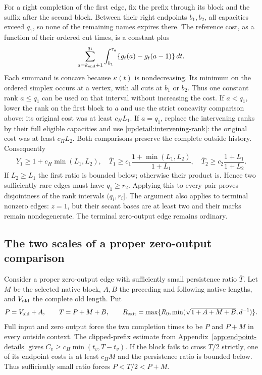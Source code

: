 For a right completion of the first edge, fix the prefix through its
block and the suffix after the second block. Between their right
endpoints $b_1,b_2$, all capacities exceed $q_1$, so none of the
remaining names expires there. The reference cost, as a function of
their ordered cut times, is a constant plus
\[
 \sum_{a=k_{\rm end}+1}^{q_1}
 \int_{b_1}^{\tau_a}\{g_t(a)-g_t(a-1)\}\,dt.
\]
Each summand is concave because $\kappa(t)$ is nondecreasing. Its
minimum on the ordered simplex occurs at a vertex, with all cuts
at $b_1$ or $b_2$. Thus one constant rank $a\leq q_1$ can be used
on that interval without increasing the cost. If $a<q_1$, lower the
rank on the first block to $a$ and use the strict concavity comparison
above: its original cost was at least $c_HL_1$. If $a=q_1$, replace
the intervening ranks by their full eligible capacities and use
\eqref{updetail:intervening-rank}: the original cost was at least
$c_HL_2$. Both comparisons preserve the complete outside history.
Consequently
\[
 Y_1\geq1+c_H\min(L_1,L_2),\quad
 \overline T_1\geq c_1\frac{1+\min(L_1,L_2)}{1+L_1},\quad
 \overline T_2\geq c_2\frac{1+L_1}{1+L_2}.
\]
If $L_2\geq L_1$ the first ratio is bounded below; otherwise their
product is. Hence two sufficiently rare edges must have $q_1\geq r_2$.
Applying this to every pair proves disjointness of the rank intervals
$(q_i,r_i]$. The argument also applies to terminal nonzero edges:
$z=1$, but their secant bases are at least two and their marks remain
nondegenerate. The terminal zero-output edge remains ordinary.

\subsection{The two scales of a proper zero-output comparison}
\label{updetail:zero-scales}
Consider a proper zero-output edge with sufficiently small persistence ratio $\overline T$. Let $M$ be the selected native block, $A,B$ the preceding and following
native lengths, and $V_{\rm old}$ the complete old length. Put
\[
 P=V_{\rm old}+A,\qquad T=P+M+B,\qquad
 R_{\rm exit}=\max\{R_0,\min(\sqrt{1+A+M+B},d^{-1})\}.
\]
Full input and zero output force the two completion times to be
$P$ and $P+M$ in every outside context. The clipped-prefix estimate
from Appendix~\ref{app:endpoint-details} gives
$\overline C_v\geq c_H\min(t_v,T-t_v)$.
If the block fails to cross $T/2$ strictly, one of its endpoint costs
is at least $c_HM$ and the persistence ratio is bounded below.
Thus sufficiently small ratio forces $P<T/2<P+M$.

